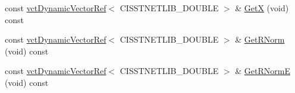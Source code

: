 \begin{DoxyCompactItemize}
\item 
const \hyperlink{classvct_dynamic_vector_ref}{vct\+Dynamic\+Vector\+Ref}$<$ C\+I\+S\+S\+T\+N\+E\+T\+L\+I\+B\+\_\+\+D\+O\+U\+B\+L\+E $>$ \& \hyperlink{classnmr_l_sq_lin_solution_dynamic_a0e7de21d17e32115b5776dc36fff5b24}{Get\+X} (void) const 
\item 
const \hyperlink{classvct_dynamic_vector_ref}{vct\+Dynamic\+Vector\+Ref}$<$ C\+I\+S\+S\+T\+N\+E\+T\+L\+I\+B\+\_\+\+D\+O\+U\+B\+L\+E $>$ \& \hyperlink{classnmr_l_sq_lin_solution_dynamic_a056dd5c8c1ddc75d327d16ee8849738e}{Get\+R\+Norm} (void) const 
\item 
const \hyperlink{classvct_dynamic_vector_ref}{vct\+Dynamic\+Vector\+Ref}$<$ C\+I\+S\+S\+T\+N\+E\+T\+L\+I\+B\+\_\+\+D\+O\+U\+B\+L\+E $>$ \& \hyperlink{classnmr_l_sq_lin_solution_dynamic_a9c4dae598654f878f32f06f808c32ac2}{Get\+R\+Norm\+E} (void) const 
\end{DoxyCompactItemize}
